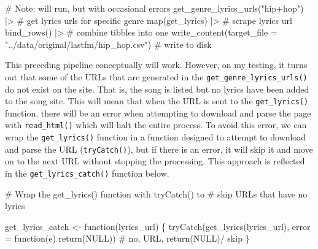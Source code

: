 \documentclass[
  letterpaper,
]{latex/krantz}
\newenvironment{Shaded}{\begin{snugshade}}{\end{snugshade}}
\newcommand{\AttributeTok}[1]{\textcolor[rgb]{0.40,0.45,0.13}{#1}}
\newcommand{\CommentTok}[1]{\textcolor[rgb]{0.37,0.37,0.37}{#1}}
\newcommand{\ConstantTok}[1]{\textcolor[rgb]{0.56,0.35,0.01}{#1}}
\newcommand{\ControlFlowTok}[1]{\textcolor[rgb]{0.00,0.23,0.31}{#1}}
\newcommand{\FunctionTok}[1]{\textcolor[rgb]{0.28,0.35,0.67}{#1}}
\newcommand{\NormalTok}[1]{\textcolor[rgb]{0.00,0.23,0.31}{#1}}
\newcommand{\OtherTok}[1]{\textcolor[rgb]{0.00,0.23,0.31}{#1}}
\newcommand{\SpecialCharTok}[1]{\textcolor[rgb]{0.37,0.37,0.37}{#1}}
\newcommand{\StringTok}[1]{\textcolor[rgb]{0.13,0.47,0.30}{#1}}
\begin{document}
\begin{Shaded}
\begin{Highlighting}[]
\CommentTok{\# Note: will run, but with occasional errors}
\FunctionTok{get\_genre\_lyrics\_urls}\NormalTok{(}\StringTok{"hip+hop"}\NormalTok{) }\SpecialCharTok{|\textgreater{}} \CommentTok{\# get lyrics urls for specific genre}
  \FunctionTok{map}\NormalTok{(get\_lyrics) }\SpecialCharTok{|\textgreater{}}  \CommentTok{\# scrape lyrics url}
  \FunctionTok{bind\_rows}\NormalTok{() }\SpecialCharTok{|\textgreater{}} \CommentTok{\# combine tibbles into one}
  \FunctionTok{write\_content}\NormalTok{(}\AttributeTok{target\_file =} \StringTok{"../data/original/lastfm/hip\_hop.csv"}\NormalTok{) }\CommentTok{\# write to disk}
\end{Highlighting}
\end{Shaded}

This preceding pipeline conceptually will work. However, on my testing,
it turns out that some of the URLs that are generated in the
\texttt{get\_genre\_lyrics\_urls()} do not exist on the site. That is,
the song is listed but no lyrics have been added to the song site. This
will mean that when the URL is sent to the \texttt{get\_lyrics()}
function, there will be an error when attempting to download and parse
the page with \texttt{read\_html()} which will halt the entire process.
To avoid this error, we can wrap the \texttt{get\_lyrics()} function in
a function designed to attempt to download and parse the URL
(\texttt{tryCatch()}), but if there is an error, it will skip it and
move on to the next URL without stopping the processing. This approach
is reflected in the \texttt{get\_lyrics\_catch()} function below.

\begin{Shaded}
\begin{Highlighting}[]
\CommentTok{\# Wrap the \textasciigrave{}get\_lyrics()\textasciigrave{} function with \textasciigrave{}tryCatch()\textasciigrave{} to }
\CommentTok{\# skip URLs that have no lyrics}

\NormalTok{get\_lyrics\_catch }\OtherTok{\textless{}{-}} \ControlFlowTok{function}\NormalTok{(lyrics\_url) \{}
  \FunctionTok{tryCatch}\NormalTok{(}\FunctionTok{get\_lyrics}\NormalTok{(lyrics\_url), }
           \AttributeTok{error =} \ControlFlowTok{function}\NormalTok{(e) }\FunctionTok{return}\NormalTok{(}\ConstantTok{NULL}\NormalTok{)) }\CommentTok{\# no, URL, return(NULL)/ skip}
\NormalTok{\}}
\end{Highlighting}
\end{Shaded}
\end{document}
